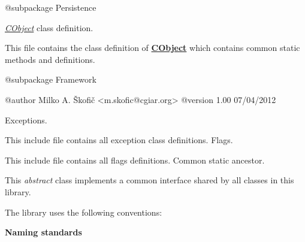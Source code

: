 \begin{DoxyVerb} @subpackage        Persistence\end{DoxyVerb}


{\itshape \hyperlink{class_c_object}{C\-Object}} class definition.

This file contains the class definition of {\bfseries \hyperlink{class_c_object}{C\-Object}} which contains common static methods and definitions.

\begin{DoxyVerb} @subpackage        Framework

 @author            Milko A. Škofič <m.skofic@cgiar.org>
 @version   1.00 07/04/2012\end{DoxyVerb}


Exceptions.

This include file contains all exception class definitions. Flags.

This include file contains all flags definitions. Common static ancestor.

This {\itshape abstract} class implements a common interface shared by all classes in this library.

The library uses the following conventions\-:

{\bfseries Naming standards}


